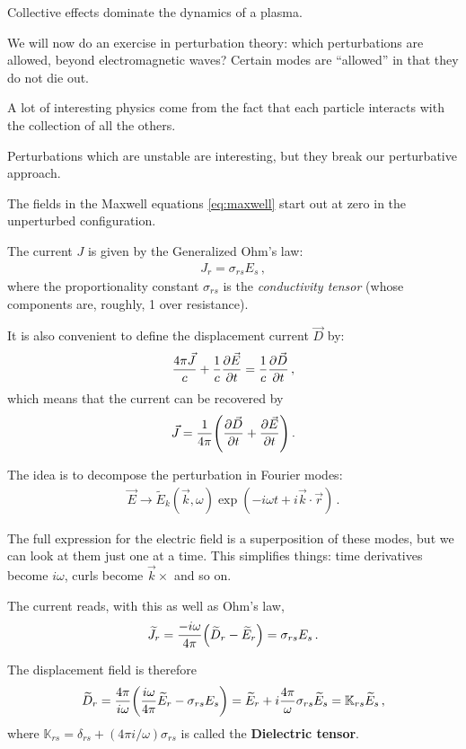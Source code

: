 \documentclass[main.tex]{subfiles}
\begin{document}
Collective effects dominate the dynamics of a plasma. 

We will now do an exercise in perturbation theory: which perturbations are allowed, beyond electromagnetic waves? 
Certain modes are ``allowed'' in that they do not die out. 

A lot of interesting physics come from the fact that each particle interacts with the collection of all the others. 

Perturbations which are unstable are interesting, but they break our perturbative approach. 

The fields in the Maxwell equations \eqref{eq:maxwell} start out at zero in the unperturbed configuration. 

The current \(J\) is given by the Generalized Ohm's law: 
%
\begin{align}
J_r = \sigma_{rs} E_s 
\,,
\end{align}
%
where the proportionality constant \(\sigma _{rs}\) is the \emph{conductivity tensor} (whose components are, roughly, 1 over resistance). 

It is also convenient to define the displacement current \(\vec{D}\) by:
%
\begin{align}
\frac{4 \pi \vec{J}}{c} + \frac{1}{c} \pdv{\vec{E}}{t} = \frac{1}{c} \pdv{\vec{D}}{t}
\,,
\end{align}
%
which means that the current can be recovered by 
%
\begin{align}
\vec{J} = \frac{1}{4 \pi } \qty(\pdv{\vec{D}}{t} + \pdv{\vec{E}}{t})
\,.
\end{align}

The idea is to decompose the perturbation in Fourier modes:
%
\begin{align}
 \vec{E} \to \widetilde{E}_k (\vec{k}, \omega ) \exp(- i \omega t + i \vec{k} \cdot \vec{r})
\,.
\end{align}

The full expression for the electric field is a superposition of these modes, but we can look at them just one at a time. 
This simplifies things: time derivatives become \(i \omega \), curls become \(\vec{k} \times \) and so on. 

The current reads, with this as well as Ohm's law,
%
\begin{align}
\widetilde{J} _r = \frac{- i \omega }{4 \pi } \qty(\widetilde{D}_r - \widetilde{E}_r) = \sigma_{rs} E_s
\,.
\end{align}

The displacement field is therefore 
%
\begin{align}
\widetilde{D}_r
= \frac{4 \pi }{ i \omega } \qty(\frac{i \omega }{ 4 \pi } \widetilde{E}_r - \sigma_{rs} E_s) = \widetilde{E}_r
+ i \frac{4 \pi }{\omega } \sigma_{rs} \widetilde{E}_s 
= \mathbb{K}_{rs} \widetilde{E}_s
\,,
\end{align}
%
where \(\mathbb{K}_{rs} = \delta_{rs} + (4 \pi i / \omega ) \sigma_{rs}\) is called the \textbf{Dielectric tensor}.
\end{document}
